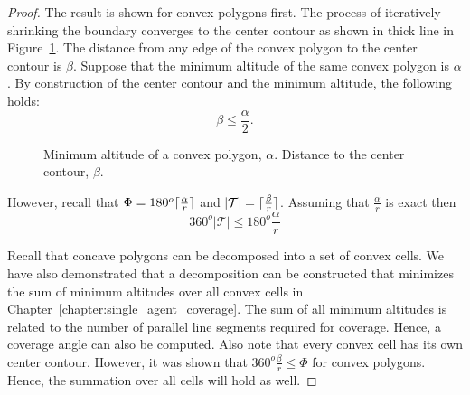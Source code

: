 \documentclass[../main.tex]{subfiles}
\begin{document}
\begin{proof}
The result is shown for convex polygons first. The process of iteratively shrinking the boundary converges to the center contour as shown in thick line in Figure~\ref{fig:skeleton_altitude}. The distance from any edge of the convex polygon to the center contour is $\beta$. Suppose that the minimum altitude of the same convex polygon is $\alpha$. By construction of the center contour and the minimum altitude, the following holds:
\begin{equation}
	\beta\leq\frac{\alpha}{2}.
\end{equation}

\begin{figure}
	\centering
	
	\caption{Minimum altitude of a convex polygon, $\alpha$. Distance to the center contour, $\beta$.}
	\label{fig:skeleton_altitude}
\end{figure}

However, recall that $\Phi=180^o\lceil\frac{\alpha}{r}\rceil$ and $|\mathcal{T}|=\lceil\frac{\beta}{r}\rceil$. Assuming that $\frac{\alpha}{r}$ is exact then
\begin{equation}
	360^o|\mathcal{T}|\leq180^o\frac{\alpha}{r}
\end{equation}

Recall that concave polygons can be decomposed into a set of convex cells. We have also demonstrated that a decomposition can be constructed that minimizes the sum of minimum altitudes over all convex cells in Chapter~\ref{chapter:single_agent_coverage}. The sum of all minimum altitudes is related to the number of parallel line segments required for coverage. Hence, a coverage angle can also be computed. Also note that every convex cell has its own center contour. However, it was shown that $360^o\frac{\beta}{r}\leq\Phi$ for convex polygons. Hence, the summation over all cells will hold as well.
\end{proof}



%		
\end{document}
